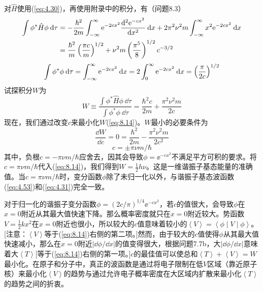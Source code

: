 \begin{examplebox}
        对$\hat{H}$使用(\ref{eq:4.30})，再使用附录中的积分，有（问题8.3）
        \begin{equation*}
            \begin{aligned}
                \int \phi^{\ast} \hat{H}\phi \:\dd \tau &= -\frac{\hbar^2}{2m} \int_{-\infty}^{\infty} \mathrm{e} ^{-2cx^2} \frac{\dd ^2\mathrm{e} ^{-cx^2}}{\dd x^2} \:\dd x + 2\pi^2\nu^2m\int_{-\infty}^{\infty} x^2 \mathrm{e} ^{-2cx^2} \:\dd x \\
                &= \frac{\hbar^2}{m} \left(\frac{\pi c}{m}\right)^{1/2} + \nu^2m\left(\frac{\pi^5}{8}\right)^{1/2} c^{-3/2}
            \end{aligned}
        \end{equation*}
        \begin{equation*}
            \int \phi^{\ast} \phi \:\dd \tau = \int_{-\infty}^{\infty} \mathrm{e} ^{-2cx^2} \:\dd x = 2\int_{0}^{\infty} \mathrm{e} ^{-2cx^2} \:\dd x = \left(\frac{\pi}{2c}\right)^{1/2}
        \end{equation*}
        试探积分$W$为
        \begin{equation}
            W \equiv \frac{\int \phi^{\ast} \hat{H}\phi \:\dd \tau}{\int \phi^{\ast} \phi \:\dd \tau} = \frac{\hbar^2c}{2m} + \frac{\pi^2\nu^2m}{2c}
            \label{eq:8.14}
        \end{equation}
        现在，我们通过改变$c$来最小化$W$(\ref{eq:8.14})。$W$最小的必要条件为
        \begin{equation*}
            \frac{\dd W}{\dd c} = 0 = \frac{\hbar^2}{2m} - \frac{\pi^2\nu^2m}{2c^2}
        \end{equation*}
        \begin{equation}
            c = \pm \pi \nu m/\hbar
            \label{eq:8.15}
        \end{equation}
        其中，负根$c = -\pi\nu m/\hbar$应舍去，因其会导致$\phi = \ee ^{-cx^2}$不满足平方可积的要求。将$c = \pi\nu m/\hbar$代入(\ref{eq:8.14})，我们得到$W = \frac{1}{2}h\nu$。这是一维谐振子基态能量的准确值。当$c = \pi\nu m/\hbar$时，变分函数$\phi$除了未归一化以外，与谐振子基态波函数(\ref{eq:4.53})和(\ref{eq:4.31})完全一致。

        对于归一化的谐振子变分函数$\phi = \left(2c/\pi\right)^{1/4} \ee ^{-cx^2}$，若$c$的值很大，会导致$\phi$在$x=0$附近从其最大值快速下降。那么概率密度就只在$x=0$附近较大。势函数$V = \frac{1}{2}kx^2$在$x=0$附近也很小，所以较大的$c$值意味着较小的$\left\langle V \right\rangle = \left\langle \phi \middle| V \middle| \phi \right\rangle$。[注意：$\left\langle V \right\rangle$等于(\ref{eq:8.14})右侧的第二项。]然而，由于较大的$c$值使得$\phi$从其最大值快速减小，那么在$x=0$附近$\left|\dd \phi/\dd x\right|$的值变得很大，根据问题7.7b，大$\left|\dd \phi/\dd x\right|$意味着大$\left\langle T \right\rangle$[等于(\ref{eq:8.14})右侧的第一项。]$c$的最佳值可以使总和$\left\langle T \right\rangle + \left\langle V \right\rangle = W$最小化。在原子和分子中，真正的波函数是通过将电子限制在低$V$区域（靠近原子核）来最小化$\left\langle V \right\rangle$的趋势与通过允许电子概率密度在大区域内扩散来最小化$\left\langle T \right\rangle$的趋势之间的折衷。
        \\


\end{examplebox}

